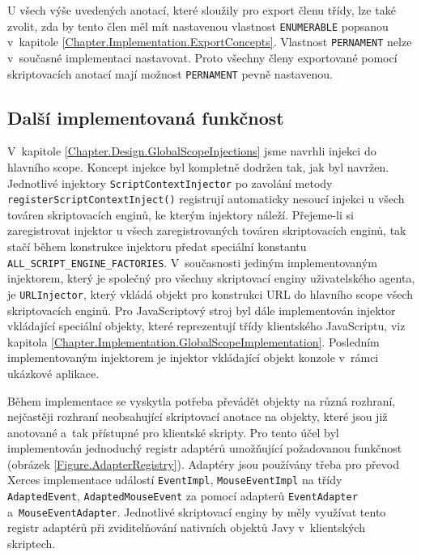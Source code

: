 U všech výše uvedených anotací, které sloužily pro export členu třídy, lze také zvolit, zda by tento člen měl mít nastavenou vlastnost \texttt{ENUMERABLE} popsanou v~kapitole \ref{Chapter.Implementation.ExportConcepts}. Vlastnost \texttt{PERNAMENT} nelze v~současné implementaci nastavovat. Proto všechny členy exportované pomocí skriptovacích anotací mají možnost \texttt{PERNAMENT} pevně nastavenou.

\subsection{Další implementovaná funkčnost}
\label{Chapter.Implementation.OtherFunctionality}

V~kapitole \ref{Chapter.Design.GlobalScopeInjections} jsme navrhli injekci do hlavního scope. Koncept injekce byl kompletně dodržen tak, jak byl navržen. Jednotlivé injektory \texttt{ScriptContextInjector} po zavolání metody \texttt{registerScriptContextInject()} registrují automaticky nesoucí injekci u všech továren skriptovacích enginů, ke kterým injektory náleží. Přejeme-li si zaregistrovat injektor u všech zaregistrovaných továren skriptovacích enginů, tak stačí během konstrukce injektoru předat speciální konstantu \texttt{ALL\_SCRIPT\_ENGINE\_FACTORIES}. V~současnosti jediným implementovaným injektorem, který je společný pro všechny skriptovací enginy uživatelského agenta, je \texttt{URLInjector}, který vkládá objekt pro konstrukci URL do hlavního scope  všech skriptovacích enginů. Pro JavaScriptový stroj byl dále implementován injektor vkládající speciální objekty, které reprezentují třídy klientského JavaScriptu, viz kapitola \ref{Chapter.Implementation.GlobalScopeImplementation}. Posledním implementovaným injektorem je injektor vkládající objekt konzole v~rámci ukázkové aplikace. 

Během implementace se vyskytla potřeba převádět objekty na různá rozhraní, nejčastěji rozhraní neobsahující skriptovací anotace na objekty, které jsou již anotované a~tak přístupné pro klientské skripty. Pro tento účel byl implementován jednoduchý registr adaptérů umožňující požadovanou funkčnost (obrázek \ref{Figure.AdapterRegistry}). Adaptéry jsou používány třeba pro převod Xerces implementace událostí \texttt{EventImpl}, \texttt{MouseEventImpl} na třídy \texttt{AdaptedEvent}, \texttt{AdaptedMouseEvent} za pomocí adapterů \texttt{EventAdapter} a~\texttt{MouseEventAdapter}. Jednotlivé skriptovací enginy by měly využívat tento registr adaptérů při zviditelňování nativních objektů Javy v~klientských skriptech.

